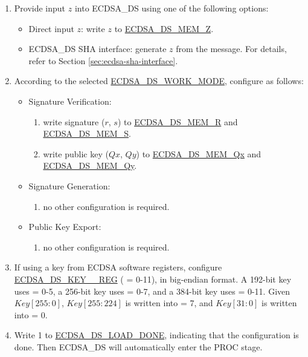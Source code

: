 \documentclass[main\_\_EN.tex]{subfiles}
\begin{document}
\begin{enumerate}
	\item Provide input $z$ into ECDSA\_DS using one of the following options:
	      \begin{itemize}
		      \item Direct input $z$: write $z$ to \hyperref[tab:ecdsa-memory]{ECDSA\_DS\_MEM\_Z}.
		      \item ECDSA\_DS SHA interface: generate $z$ from the message. For details, refer to Section \ref{sec:ecdsa-sha-interface}.
	      \end{itemize}
	\item According to the selected \hyperref[fielddesc:ECDSADSWORKMODE]{ECDSA\_DS\_WORK\_MODE}, configure as follows:
	      \begin{itemize}
		      \item Signature Verification:
		            \begin{enumerate}
			            \item write signature ($r$, $s$) to \hyperref[tab:ecdsa-memory]{ECDSA\_DS\_MEM\_R} and \hyperref[tab:ecdsa-memory]{ECDSA\_DS\_MEM\_S}.
			            \item write public key ($Qx$, $Qy$) to \hyperref[tab:ecdsa-memory]{ECDSA\_DS\_MEM\_Qx} and \hyperref[tab:ecdsa-memory]{ECDSA\_DS\_MEM\_Qy}.
		            \end{enumerate}
		      \item Signature Generation:
		            \begin{enumerate}
			            \item no other configuration is required.
		            \end{enumerate}
                \item Public Key Export:
		            \begin{enumerate}
                            \item no other configuration is required. 
		            \end{enumerate}
	      \end{itemize}
        \item If using a key from ECDSA software registers, configure \hyperref[regdesc:ECDSADSKEY0REG]{ECDSA\_DS\_KEY\_\_REG} ( = 0-11), in big-endian format. A 192-bit key uses  = 0-5, a 256-bit key uses  = 0-7, and a 384-bit key uses  = 0-11. Given $Key[255:0]$, $Key[255:224]$ is written into  = 7, and $Key[31:0]$ is written into  = 0.
        \label{sec:ecdsa-software-key-load-stage}
	\item Write 1 to \hyperref[fielddesc:ECDSADSLOADDONE]{ECDSA\_DS\_LOAD\_DONE}, indicating that the configuration is done. Then ECDSA\_DS will automatically enter the PROC stage.
\end{enumerate}
\end{document}
